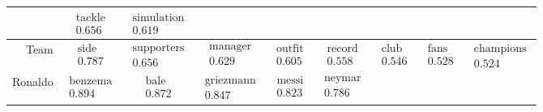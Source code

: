 \documentclass{beamer}
\begin{document}
\begin{frame}
\begin{tabular}{r|c c c c c c c c}
 & $\begin{matrix}\text{tackle}\\0.656\end{matrix}$
 & $\begin{matrix}\text{simulation}\\0.619\end{matrix}$
\\\hline
Team
 & $\begin{matrix}\text{side}\\0.787\end{matrix}$
 & $\begin{matrix}\text{supporters}\\0.656\end{matrix}$
 & $\begin{matrix}\text{manager}\\0.629\end{matrix}$
 & $\begin{matrix}\text{outfit}\\0.605\end{matrix}$
 & $\begin{matrix}\text{record}\\0.558\end{matrix}$
 & $\begin{matrix}\text{club}\\0.546\end{matrix}$
 & $\begin{matrix}\text{fans}\\0.528\end{matrix}$
 & $\begin{matrix}\text{champions}\\0.524\end{matrix}$
\\\hline
Ronaldo
 & $\begin{matrix}\text{benzema}\\0.894\end{matrix}$
 & $\begin{matrix}\text{bale}\\0.872\end{matrix}$
 & $\begin{matrix}\text{griezmann}\\0.847\end{matrix}$
 & $\begin{matrix}\text{messi}\\0.823\end{matrix}$
 & $\begin{matrix}\text{neymar}\\0.786\end{matrix}$

\end{tabular}
\end{frame}
\end{document}
